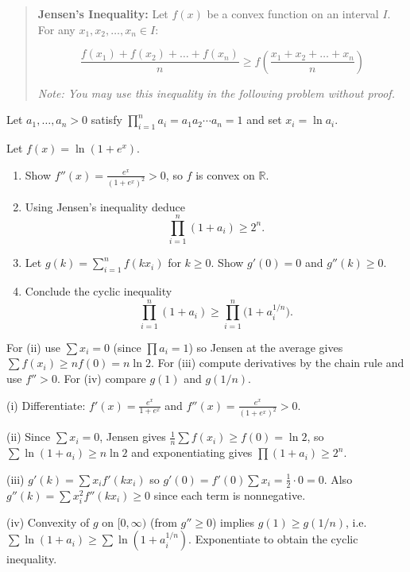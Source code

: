 \begin{problem}

\begin{quote}
\textbf{Jensen's Inequality:}
Let $f(x)$ be a convex function on an interval $I$. For any $x_1, x_2, \dots, x_n \in I$:

\[ \frac{f(x_1) + f(x_2) + \dots + f(x_n)}{n} \geq f\left( \frac{x_1 + x_2 + \dots + x_n}{n} \right) \]

\textit{Note: You may use this inequality in the following problem without proof.}

\end{quote}

Let $a_1,\dots,a_n>0$ satisfy $\prod_{i=1}^n a_i = a_1 a_2 \cdots a_n = 1$ and set $x_i=\ln a_i$. 

Let $f(x)=\ln(1+e^x)$.

\begin{enumerate}
    \item[(i)] Show $f''(x)=\tfrac{e^x}{(1+e^x)^2}>0$, so $f$ is convex on $\mathbb{R}$.
    \item[(ii)] Using Jensen's inequality deduce
    \[ \prod_{i=1}^n(1+a_i)\ge 2^n. \]
    \item[(iii)] Let $g(k)=\sum_{i=1}^n f(kx_i)$ for $k\ge0$. Show $g'(0)=0$ and $g''(k)\ge0$.
    \item[(iv)] Conclude the cyclic inequality
    \[ \prod_{i=1}^n(1+a_i)\ge\prod_{i=1}^n\big(1+a_i^{1/n}\big). \]
\end{enumerate}
\end{problem}

\begin{hint}
For (ii) use $\sum x_i=0$ (since $\prod a_i=1$) so Jensen at the average gives $\sum f(x_i)\ge n f(0)=n\ln2$. For (iii) compute derivatives by the chain rule and use $f''>0$. For (iv) compare $g(1)$ and $g(1/n)$.
\end{hint}

\begin{solution}
(i) Differentiate: $f'(x)=\tfrac{e^x}{1+e^x}$ and $f''(x)=\tfrac{e^x}{(1+e^x)^2}>0$. 

(ii) Since $\sum x_i=0$, Jensen gives $\frac{1}{n}\sum f(x_i)\ge f(0)=\ln2$, so $\sum\ln(1+a_i)\ge n\ln2$ and exponentiating gives $\prod(1+a_i)\ge2^n$.

(iii) $g'(k)=\sum x_i f'(kx_i)$ so $g'(0)=f'(0)\sum x_i=\tfrac12\cdot0=0$. Also $g''(k)=\sum x_i^2 f''(kx_i)\ge0$ since each term is nonnegative.

(iv) Convexity of $g$ on $[0,\infty)$ (from $g''\ge0$) implies $g(1)\ge g(1/n)$, i.e. $\sum\ln(1+a_i)\ge\sum\ln(1+a_i^{1/n})$. Exponentiate to obtain the cyclic inequality.
\end{solution}

